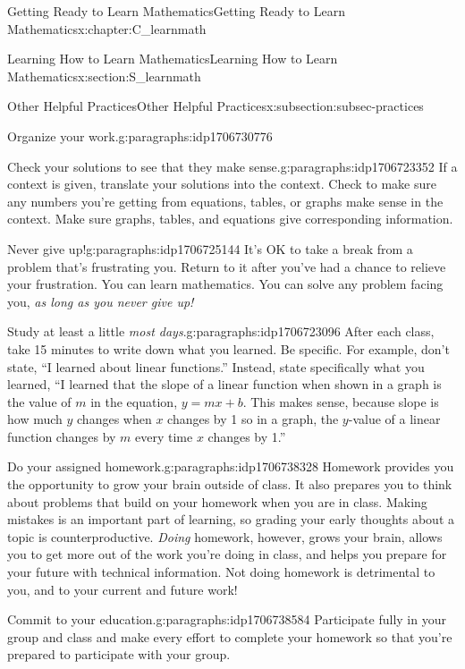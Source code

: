 \documentclass[oneside,10pt,]{book}
\numberwithin{equation}{chapter}
\begin{document}
\begin{chapterptx}{Getting Ready to Learn Mathematics}{}{Getting Ready to Learn Mathematics}{}{}{x:chapter:C_learnmath}
\begin{sectionptx}{Learning How to Learn Mathematics}{}{Learning How to Learn Mathematics}{}{}{x:section:S_learnmath}
\begin{subsectionptx}{Other Helpful Practices}{}{Other Helpful Practices}{}{}{x:subsection:subsec-practices}
\begin{paragraphs}{Organize your work.}{g:paragraphs:idp1706730776}
\end{paragraphs}%
\begin{paragraphs}{Check your solutions to see that they make sense.}{g:paragraphs:idp1706723352}%
If a context is given, translate your solutions into the context. Check to make sure any numbers you're getting from equations, tables, or graphs make sense in the context. Make sure graphs, tables, and equations give corresponding information.%
\end{paragraphs}%
\begin{paragraphs}{Never give up!}{g:paragraphs:idp1706725144}%
It's OK to take a break from a problem that's frustrating you. Return to it after you've had a chance to relieve your frustration. You can learn mathematics. You can solve any problem facing you, \emph{as long as you never give up!}%
\end{paragraphs}%
\begin{paragraphs}{Study at least a little \emph{most days}.}{g:paragraphs:idp1706723096}%
After each class, take 15 minutes to write down what you learned. Be specific. For example, don't state, ``I learned about linear functions.'' Instead, state specifically what you learned, ``I learned that the slope of a linear function when shown in a graph is the value of \(m\) in the equation, \(y = mx + b\). This makes sense, because slope is how much \(y\) changes when \(x\) changes by 1 so in a graph, the \(y\)-value of a linear function changes by \(m\) every time \(x\) changes by 1.''%
\end{paragraphs}%
\begin{paragraphs}{Do your assigned homework.}{g:paragraphs:idp1706738328}%
Homework provides you the opportunity to grow your brain outside of class. It also prepares you to think about problems that build on your homework when you are in class. Making mistakes is an important part of learning, so grading your early thoughts about a topic is counterproductive. \emph{Doing} homework, however, grows your brain, allows you to get more out of the work you're doing in class, and helps you prepare for your future with technical information. Not doing homework is detrimental to you, and to your current and future work!%
\end{paragraphs}%
\begin{paragraphs}{Commit to your education.}{g:paragraphs:idp1706738584}%
Participate fully in your group and class and make every effort to complete your homework so that you're prepared to participate with your group.%
\end{paragraphs}%

\end{subsectionptx}
\end{sectionptx}
\end{chapterptx}
\end{document}

